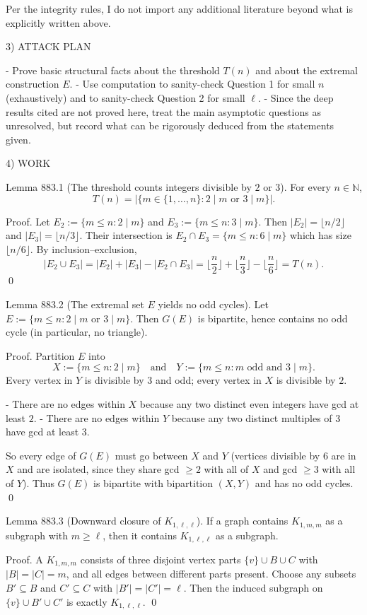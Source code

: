Per the integrity rules, I do not import any additional literature beyond what is explicitly written above.

3) ATTACK PLAN

- Prove basic structural facts about the threshold $T(n)$ and about the extremal construction $E$.
- Use computation to sanity-check Question 1 for small $n$ (exhaustively) and to sanity-check Question 2 for small $\ell$.
- Since the deep results cited are not proved here, treat the main asymptotic questions as unresolved, but record what can be rigorously deduced from the statements given.

4) WORK

Lemma 883.1 (The threshold counts integers divisible by $2$ or $3$).
For every $n\in\mathbb N$,
\[T(n)=\big|\{m\in\{1,\dots,n\}: 2\mid m\text{ or }3\mid m\}\big|.
\]

Proof.
Let $E_2:=\{m\le n: 2\mid m\}$ and $E_3:=\{m\le n: 3\mid m\}$. Then $|E_2|=\lfloor n/2\rfloor$ and $|E_3|=\lfloor n/3\rfloor$.
Their intersection is $E_2\cap E_3=\{m\le n: 6\mid m\}$ which has size $\lfloor n/6\rfloor$.
By inclusion--exclusion,
\[|E_2\cup E_3|=|E_2|+|E_3|-|E_2\cap E_3|=\Big\lfloor\frac n2\Big\rfloor+\Big\lfloor\frac n3\Big\rfloor-\Big\lfloor\frac n6\Big\rfloor=T(n).\]
\qed

Lemma 883.2 (The extremal set $E$ yields no odd cycles).
Let $E:=\{m\le n:2\mid m\text{ or }3\mid m\}$. Then $G(E)$ is bipartite, hence contains no odd cycle (in particular, no triangle).

Proof.
Partition $E$ into
\[X:=\{m\le n:2\mid m\}\quad\text{and}\quad Y:=\{m\le n: m\text{ odd and }3\mid m\}.
\]
Every vertex in $Y$ is divisible by $3$ and odd; every vertex in $X$ is divisible by $2$.

- There are no edges within $X$ because any two distinct even integers have gcd at least $2$.
- There are no edges within $Y$ because any two distinct multiples of $3$ have gcd at least $3$.

So every edge of $G(E)$ must go between $X$ and $Y$ (vertices divisible by $6$ are in $X$ and are isolated, since they share gcd $\ge2$ with all of $X$ and gcd $\ge3$ with all of $Y$).
Thus $G(E)$ is bipartite with bipartition $(X,Y)$ and has no odd cycles. \qed

Lemma 883.3 (Downward closure of $K_{1,\ell,\ell}$).
If a graph contains $K_{1,m,m}$ as a subgraph with $m\ge \ell$, then it contains $K_{1,\ell,\ell}$ as a subgraph.

Proof.
A $K_{1,m,m}$ consists of three disjoint vertex parts $\{v\}\cup B\cup C$ with $|B|=|C|=m$, and all edges between different parts present.
Choose any subsets $B'\subseteq B$ and $C'\subseteq C$ with $|B'|=|C'|=\ell$.
Then the induced subgraph on $\{v\}\cup B'\cup C'$ is exactly $K_{1,\ell,\ell}$. \qed


